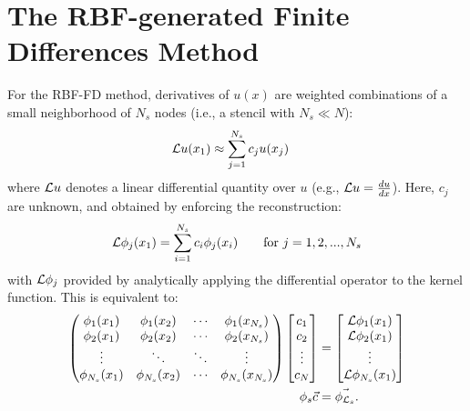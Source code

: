 \documentclass{report}
\begin{document}
{\section{The RBF-generated Finite Differences Method}


For the RBF-FD method, derivatives of $u(x)$ are weighted combinations of a small neighborhood of $N_s$ nodes (i.e., a stencil with $N_s \ll N$):
        \begin{align} 
        \mathcal{L}u(x_1) &\approx \sum_{j=1}^{N_s} c_j u(x_j) \nonumber 
        \label{eq:derivFromFDWeights}
        \end{align}
where $\mathcal{L}u$ denotes a linear differential quantity over $u$ (e.g., $\mathcal{L}u = \frac{d u}{d x}$). Here, ${c_j}$ are unknown, and obtained by enforcing the reconstruction:
	\begin{align}
	        \mathcal{L}\phi_j(x_1) = \sum_{i=1}^{N_s} c_i \phi_j(x_i) \ \ \ \ \ \ \textrm{for }j=1,2,...,N_s \nonumber 
	\end{align}
with $\mathcal{L}\phi_j$ provided by analytically applying the differential operator to the kernel function.
This is equivalent to: 
	\begin{align}        
          \begin{pmatrix}  
            \phi_1(x_1) & \phi_1(x_2) & \cdots & \phi_1(x_{N_s}) \\ 
            \phi_2(x_1) & \phi_2(x_2) & \cdots & \phi_2(x_{N_s}) \\ 
            \vdots & \ddots & \ddots & \vdots \\
            \phi_{N_s}(x_1) & \phi_{N_s}(x_2) & \cdots & \phi_{N_s}(x_{N_s})
                \end{pmatrix} 
                \begin{bmatrix} c_1 \\ c_2 \\ \vdots \\ c_N \end{bmatrix}
               &=                \begin{bmatrix} \diffop{\phi_1}(x_1) \\  \diffop{\phi_2}(x_1) \\ \vdots \\  \diffop{\phi_{N_s}}(x_1) 
               \end{bmatrix} \\
                         \phi_{s} \vec{c} &= \vec{\phi_{\diffop{}_s}}.%

\end{align}}
\end{document}
